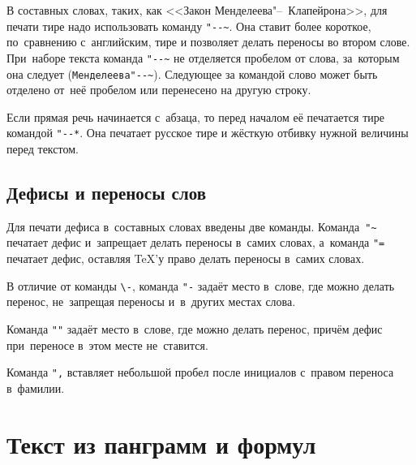 В составных словах, таких, как <<Закон Менделеева"--~Клапейрона>>, для печати
тире надо использовать команду \verb|"--~|. Она ставит более короткое,
по~сравнению с~английским, тире и позволяет делать переносы во втором слове.
При~наборе текста команда \verb|"--~| не отделяется пробелом от слова,
за~которым она следует (\verb|Менделеева"--~|). Следующее за командой слово
может быть  отделено от~неё пробелом или перенесено на другую строку.

Если прямая речь начинается с~абзаца, то перед началом её печатается тире
командой \verb|"--*|. Она печатает русское тире и жёсткую отбивку нужной
величины перед текстом.

\subsection{Дефисы и переносы слов}
Для печати дефиса в~составных словах введены две команды. Команда~\verb|"~|
печатает дефис и~запрещает делать переносы в~самих словах, а~команда \verb|"=|
печатает дефис, оставляя \TeX ’у право делать переносы в~самих словах.

В отличие от команды \verb|\-|, команда \verb|"-| задаёт место в~слове, где
можно делать перенос, не~запрещая переносы и~в~других местах слова.

Команда \verb|""| задаёт место в~слове, где можно делать перенос, причём дефис
при~переносе в~этом месте не~ставится.

Команда \verb|",| вставляет небольшой пробел после инициалов с~правом переноса
в~фамилии.

\section{Текст из панграмм и формул}